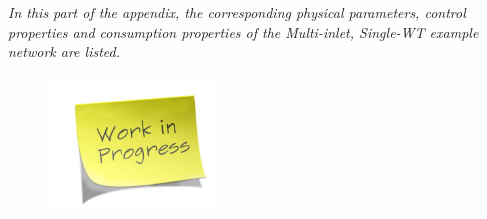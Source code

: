 \emph{In this part of the appendix, the corresponding physical parameters, control properties and consumption properties of the Multi-inlet, Single-WT example network are listed.}

\begin{figure}[H]
\centering
\includegraphics[width=0.4\textwidth]{report/pictures/missingfigure}
\end{figure}




